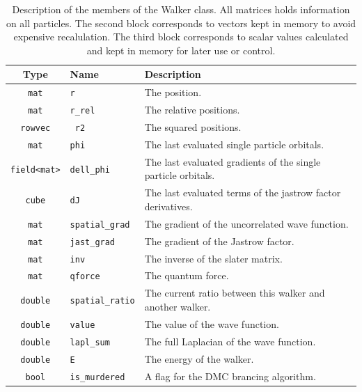 \begin{table}

 \begin{center}

 \begin{tabular}{|c l l|}
 \hline
 Type & Name & Description \\
 
 \hline
 \hline
 
 \verb+mat+         & \verb+r+             & The position.\\

 \hline
 \hline
 
 \verb+mat+         & \verb+r_rel+         & The relative positions.\\
 \verb+rowvec+      & \verb+ r2+           & The squared positions. \\
 \verb+mat+         & \verb+phi+           & The last evaluated single particle orbitals. \\
 \verb+field<mat>+  & \verb+dell_phi+      & The last evaluated gradients of the single particle orbitals. \\
 \verb+cube+        & \verb+dJ+            & The last evaluated terms of the jastrow factor derivatives. \\
 \verb+mat+         & \verb+spatial_grad+  & The gradient of the uncorrelated wave function.\\
 \verb+mat+         & \verb+jast_grad+     & The gradient of the Jastrow factor.\\
 \verb+mat+         & \verb+inv+           & The inverse of the slater matrix.\\
 \verb+mat+         & \verb+qforce+        & The quantum force.\\
 
 \hline 
 \hline
 
 \verb+double+      & \verb+spatial_ratio+ & The current ratio between this walker and another walker.\\
 \verb+double+      & \verb+value+         & The value of the wave function.\\
 \verb+double+      & \verb+lapl_sum+      & The full Laplacian of the wave function.\\
 \verb+double+      & \verb+E+             & The energy of the walker. \\
 \verb+bool+        & \verb+is_murdered+   & A flag for the DMC brancing algorithm. \\
 \hline 
 \end{tabular}
 
 \caption{Description of the members of the Walker class. All matrices holds information on all particles.
The second block corresponds to vectors kept in memory to avoid expensive recalulation. The third block corresponds to  scalar values calculated and kept in memory for later use or control.}
 \label{tab:walkerClassMembers}
 
 \end{center}
\end{table}

